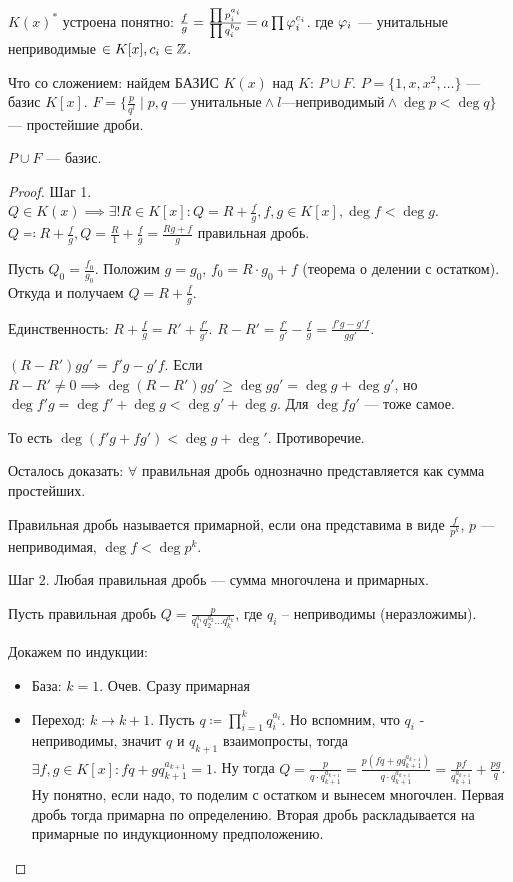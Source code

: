 $K(x)^*$ устроена понятно:  $\frac{f}{g} = \frac{\prod p_i^{a_i}}{\prod q_i^{b_o}} = a \prod \varphi_i^{c_i}$. где $\varphi_i$ --- унитальные неприводимые  $\in K[x], c_i \in \mathbb{Z}$.

Что со сложением: найдем БАЗИС  $K(x)$ над  $K$:  $P \cup F$.  $P = \{1, x, x^2, \ldots\}$ --- базис $K[x]$.  $F = \{ \frac{p}{q^l} \mid p, q\text{ --- унитальные} \land l\text{---неприводимый} \land \deg p < \deg q\}$ --- простейшие дроби.

\begin{theorem}
    $P\cup F$ --- базис.
\end{theorem}
\begin{proof}
    Шаг 1. $Q \in K(x) \implies \exists! R \in K[x]\!: Q = R + \frac{f}{g}, f, g \in K[x], \deg f < \deg g$. $Q \eqqcolon R + \frac{f}{g},Q = \frac{R}{1} + \frac{f}{g} = \frac{Rg+f}{g}$ правильная дробь.

    Пусть $Q_0 = \frac{f_0}{g_0}$. Положим $g = g_0$, $f_0 = R \cdot g_0 +f$ (теорема о делении с остатком). Откуда и получаем $Q = R + \frac{f}{g}$. 

    Единственность: $R + \frac{f}{g} = R' + \frac{f'}{g'}$. $R - R' = \frac{f'}{g'} - \frac{f}{g} = \frac{f'g - g'f}{gg'}$.

    $(R-R')gg' = f'g - g'f$. Если  $R - R' \neq 0 \implies \deg (R-R')gg' \ge \deg gg' = \deg g + \deg g'$, но $\deg f'g = \deg f' + \deg g < \deg g' + \deg g$. Для  $\deg fg'$ --- тоже самое.

    То есть  $\deg (f'g + fg') < \deg g + \deg'$. Противоречие.

    Осталось доказать:  $\forall$ правильная дробь однозначно представляется как сумма простейших. 
     \begin{definition}
        Правильная дробь называется примарной, если она представима в виде $\frac{f}{p^k}$, $p$ --- неприводимая,  $\deg f < \deg p^k$.
    \end{definition}
    
    Шаг 2. Любая правильная дробь --- сумма многочлена и примарных.
    
    Пусть правильная дробь $Q=\frac{p}{q_1^{a_1}q_2^{a_2}\ldots q_k^{a_k}}$, где $q_i$ -- неприводимы (неразложимы).
    
    Докажем по индукции:
    \begin{itemize}
         \item База: $k=1$. Очев. Сразу примарная
         \item Переход: $k \to k + 1$. Пусть $q \coloneqq \prod\limits_{i=1}^{k}q_i^{a_i}$. Но вспомним, что $q_i$ - неприводимы, значит $q$ и $q_{k + 1}$ взаимопросты, тогда $\exists f, g \in K[x] : fq + gq_{k+1}^{a_{k+1}} = 1$. Ну тогда $Q = \frac{p}{q\cdot q_{k + 1}^{a_{k + 1}}} = \frac{p\left(fq + gq_{k+1}^{a_{k+1}}\right)}{q\cdot q_{k + 1}^{a_{k + 1}}} = \frac{pf}{q_{k + 1}^{a_{k + 1}}} + \frac{pg}{q}$. Ну понятно, если надо, то поделим с остатком и вынесем многочлен. Первая дробь тогда примарна по определению. Вторая дробь раскладывается на примарные по индукционному предположению.
    \end{itemize}


\end{proof}
